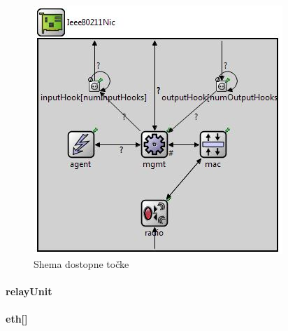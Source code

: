 \documentclass[a4paper,11pt]{article}
\begin{document}
\begin{figure}[htbp]
    \begin{center}
        \includegraphics[scale=0.8]{img/radio.jpg}
        \caption{Shema dostopne točke}
	\label{image:radio}
    \end{center}
\end{figure}


\paragraph{relayUnit}
\label{description:relayUnit}


\paragraph{eth[]}
\label{description:eth}
\end{document}
